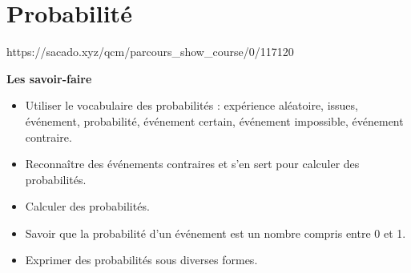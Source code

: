 \chapter{Probabilité}
{https://sacado.xyz/qcm/parcours_show_course/0/117120}
{ 

 \begin{CpsCol}
 \textbf{Les savoir-faire} 
 \begin{itemize}
 \item Utiliser le vocabulaire des probabilités : expérience aléatoire, issues, événement, probabilité, événement certain, événement impossible, événement contraire.
 \item Reconnaître des événements contraires et s’en sert pour calculer des probabilités.
 \item Calculer des probabilités.
 \item Savoir que la probabilité d'un événement est un nombre compris entre 0 et 1.
 \item Exprimer des probabilités sous diverses formes.
 
 \end{itemize}
 \end{CpsCol}
}
%
%
% 
%
% 
%



